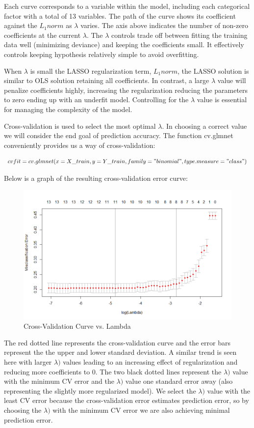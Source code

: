 \documentclass[12pt]{article}
\begin{document}
Each curve corresponds to a variable within the model, including each categorical factor with a total of 13 variables. The path of the curve shows its coefficient against the $L_{1}norm$ as $\lambda$ varies. The axis above indicates the number of non-zero coefficients at the current $\lambda$. The $\lambda$ controls trade off between fitting the training data well (minimizing deviance) and keeping the coefficients small. It effectively controls keeping hypothesis relatively simple to avoid overfitting. 
  
When $\lambda$ is small the LASSO regularization term, $L_{1}norm$, the LASSO solution is similar to OLS solution retaining all coefficients. In contrast, a large $\lambda$ value will penalize coefficients highly, increasing the regularization reducing the parameters to zero ending up with an underfit model. Controlling for the $\lambda$ value is essential for managing the complexity of the model. 

\pagebreak
Cross-validation is used to select the most optimal $\lambda$. In choosing a correct value we will consider the end goal of prediction accuracy. The function cv.glmnet conveniently provides us a way of cross-validation:

\[cvfit = cv.glmnet(x=X\_train, y=Y\_train, family = "binomial", type.measure = "class")\]

Below is a graph of the resulting cross-validation error curve:
\begin{figure}[h!]
\begin{center}
\includegraphics[scale=.5]{cv_error}
\caption{Cross-Validation Curve vs. Lambda}
\end{center}
\end{figure}

The red dotted line represents the cross-validation curve and the error bars represent the the upper and lower standard deviation. A similar trend is seen here with larger $\lambda)$ values leading to an increasing effect of regularization and reducing more coefficients to 0. The two black dotted lines represent the $\lambda)$ value with the minimum CV error and the $\lambda)$ value one standard error away (also representing the slightly more regularized model). We select the $\lambda)$ value with the least CV error because the cross-validation error estimates prediction error, so by choosing the $\lambda)$ with the minimum CV error we are also achieving minimal prediction error. 
\end{document}
